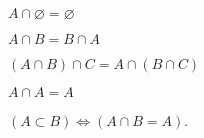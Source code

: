 \begin{proposition}
$A \cap  \varnothing = \varnothing$
\end{proposition}

\begin{proposition}[Commutativity]
$A \cap B = B \cap A$
\end{proposition}

\begin{proposition}[Associativity]
$(A \cap  B) \cap  C = A \cap  (B \cap  C)$
\end{proposition}

\begin{proposition}
$A \cap  A = A$
\end{proposition}

\begin{proposition}
$(A \subset B) \iff (A \cap B = A)$.
\end{proposition}
